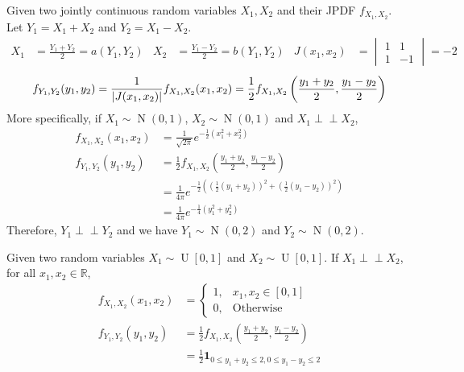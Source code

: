 \documentclass{huhtakm-template-book}
\newcommand{\independent}{\perp\!\!\!\perp}
\DeclareMathOperator{\U}{U}
\DeclareMathOperator{\N}{N}
\begin{document}
    \begin{eg}
        Given two jointly continuous random variables $X_{1},X_{2}$ and their JPDF $f_{X_{1},X_{2}}$.\\
        Let $Y_{1}=X_{1}+X_{2}$ and $Y_{2}=X_{1}-X_{2}$.
        \begin{align*}
            X_{1}&=\frac{Y_{1}+Y_{2}}{2}=a(Y_{1},Y_{2}) & X_{2}&=\frac{Y_{1}-Y_{2}}{2}=b(Y_{1},Y_{2}) & J(x_{1},x_{2})&=\begin{vmatrix}
                1 & 1\\
                1 & -1
            \end{vmatrix}=-2
        \end{align*}
        \begin{equation*}
            f_{Y_{1},Y_{2}}(y_{1},y_{2})=\frac{1}{\left|{J(x_{1},x_{2})}\right|}f_{X_{1},X_{2}}(x_{1},x_{2})=\frac{1}{2}f_{X_{1},X_{2}}\left(\frac{y_{1}+y_{2}}{2},\frac{y_{1}-y_{2}}{2}\right)
        \end{equation*}
        More specifically, if $X_{1}\sim\N(0,1)$, $X_{2}\sim\N(0,1)$ and $X_{1}\independent X_{2}$,
        \begin{align*}
            f_{X_{1},X_{2}}(x_{1},x_{2})&=\frac{1}{\sqrt{2\pi}}e^{-\frac{1}{2}(x_{1}^{2}+x_{2}^{2})}\\
            f_{Y_{1},Y_{2}}(y_{1},y_{2})&=\frac{1}{2}f_{X_{1},X_{2}}\left(\frac{y_{1}+y_{2}}{2},\frac{y_{1}-y_{2}}{2}\right)\\
            &=\frac{1}{4\pi}e^{-\frac{1}{2}\left(\left(\frac{1}{2}(y_{1}+y_{2})\right)^{2}+\left(\frac{1}{2}(y_{1}-y_{2})\right)^{2}\right)}\\
            &=\frac{1}{4\pi}e^{-\frac{1}{4}(y_{1}^{2}+y_{2}^{2})}
        \end{align*}
        Therefore, $Y_{1}\independent Y_{2}$ and we have $Y_{1}\sim\N(0,2)$ and $Y_{2}\sim\N(0,2)$.
    \end{eg}
    \begin{eg}
        Given two random variables $X_{1}\sim\U[0,1]$ and $X_{2}\sim\U[0,1]$. If $X_{1}\independent X_{2}$, for all $x_{1},x_{2}\in\mathbb{R}$,
        \begin{align*}
            f_{X_{1},X_{2}}(x_{1},x_{2})&=\begin{cases}
                1, &x_{1},x_{2}\in[0,1]\\
                0, &\text{Otherwise}
            \end{cases}\\
            f_{Y_{1},Y_{2}}(y_{1},y_{2})&=\frac{1}{2}f_{X_{1},X_{2}}\left(\frac{y_{1}+y_{2}}{2},\frac{y_{1}-y_{2}}{2}\right)\\
            &=\frac{1}{2}\mathbf{1}_{0\leq y_{1}+y_{2}\leq 2,0\leq y_{1}-y_{2}\leq 2}
        \end{align*}
    \end{eg}
\end{document}
